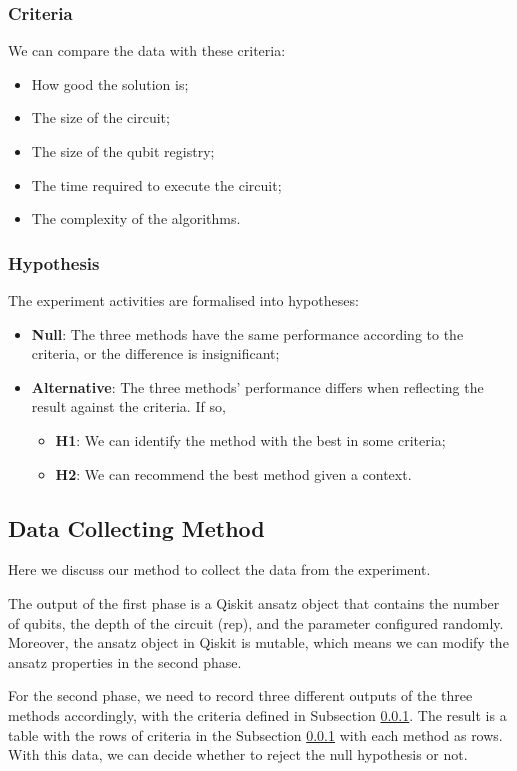 \subsubsection{Criteria}
\label{Criteria section}
We can compare the data with these criteria:
\begin{itemize}
    \item How good the solution is;
    \item The size of the circuit;
    \item The size of the qubit registry;
    \item The time required to execute the circuit;
    \item The complexity of the algorithms.
\end{itemize}

\subsubsection{Hypothesis}
The experiment activities are formalised into hypotheses:
\begin{itemize}
    \item \textbf{Null}: The three methods have the same performance according to the criteria, or the difference is insignificant;
    \item \textbf{Alternative}: The three methods' performance differs when reflecting the result against the criteria. If so,
    \begin{itemize}
        \item \textbf{H1}: We can identify the method with the best in some criteria;
        \item \textbf{H2}: We can recommend the best method given a context.
    \end{itemize}
\end{itemize}

\subsection{Data Collecting Method}
\label{Data Collecting Section}
Here we discuss our method to collect the data from the experiment.

The output of the first phase is a Qiskit ansatz object that contains the number of qubits, the depth of the circuit (rep), and the parameter configured randomly.
Moreover, the ansatz object in Qiskit is mutable, which means we can modify the ansatz properties in the second phase.

For the second phase, we need to record three different outputs of the three methods accordingly, with the criteria defined in Subsection \ref{Criteria section}.
The result is a table with the rows of criteria in the Subsection \ref{Criteria section} with each method as rows.
With this data, we can decide whether to reject the null hypothesis or not.

